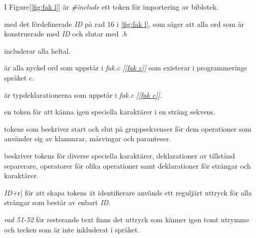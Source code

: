 \begin{description}

\item[\textit{\#include}] I Figure[\ref{fig:fak l}] är \textit{\#include} ett token för importering av biblotek. 

\item[\textit{{ID}*.h}] med det fördefinerade \textit{ID} på rad 16 i
\ref{fig:fak l}, som säger att alla ord som är konstruerade med \textit{ID} och slutar
med \textit{.h}

\item[\textit{{DIGIT}+}] includerar alla heltal.

\item[\textit{if|else|return|exit}] är alla nyckel ord som uppstår i \textit{fak.c [\ref{fak c}] }
som existerar i programmerings språket c.

\item[\textit{int|char}] är typdeklarationerna som uppstår i \textit{fak.c [\ref{fak c}]}. 

\item[\textit{\\t|\\n}] en token för att känna igen speciella karaktärer i en sträng sekvens.

\item[] tokens som beskriver start och slut på gruppsekvenser för dem
operationer som använder sig av klammrar, måsvingar och paranteser.

\item[\textit{rad 45-49}] beskriver tokens för diverse speciella karaktärer, deklarationer av
tillstånd separerare, operatorer för olika operationer samt deklarationer för strängar och
karaktärer.

\item{\textit{{ID}+}r}] för att skapa tokens åt identifierare används ett reguljärt uttryck för alla strängar som
består av enbart \textit{ID}.

\item{\textit{rad 51-52}} för resterande text finns det uttryck som känner igen tomt utrymme och
tecken som är inte inkluderat i språket.


\end{description}
